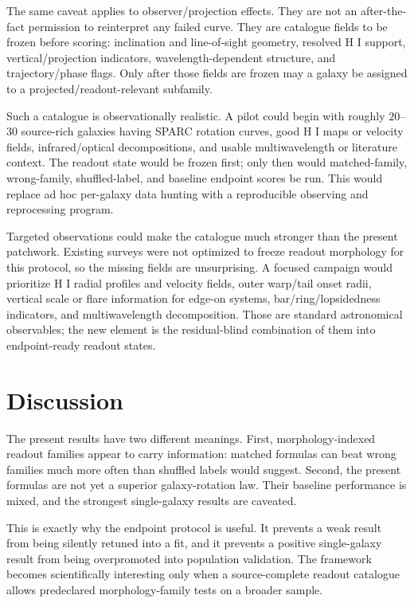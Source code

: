 \documentclass[11pt]{article}
\begin{document}
The same caveat applies to observer/projection effects.  They are not an
after-the-fact permission to reinterpret any failed curve.  They are catalogue
fields to be frozen before scoring: inclination and line-of-sight geometry,
resolved H I support, vertical/projection indicators, wavelength-dependent
structure, and trajectory/phase flags.  Only after those fields are frozen may a
galaxy be assigned to a projected/readout-relevant subfamily.

Such a catalogue is observationally realistic.  A pilot could begin with
roughly \(20\)--\(30\) source-rich galaxies having SPARC rotation curves, good H
I maps or velocity fields, infrared/optical decompositions, and usable
multiwavelength or literature context.  The readout state would be frozen first;
only then would matched-family, wrong-family, shuffled-label, and baseline
endpoint scores be run.  This would replace ad hoc per-galaxy data hunting with
a reproducible observing and reprocessing program.

Targeted observations could make the catalogue much stronger than the present
patchwork.  Existing surveys were not optimized to freeze readout morphology
for this protocol, so the missing fields are unsurprising.  A focused campaign
would prioritize H I radial profiles and velocity fields, outer warp/tail onset
radii, vertical scale or flare information for edge-on systems,
bar/ring/lopsidedness indicators, and multiwavelength decomposition.  Those are
standard astronomical observables; the new element is the residual-blind
combination of them into endpoint-ready readout states.

\section{Discussion}

The present results have two different meanings.  First, morphology-indexed
readout families appear to carry information: matched formulas can beat wrong
families much more often than shuffled labels would suggest.  Second, the
present formulas are not yet a superior galaxy-rotation law.  Their baseline
performance is mixed, and the strongest single-galaxy results are caveated.

This is exactly why the endpoint protocol is useful.  It prevents a weak result
from being silently retuned into a fit, and it prevents a positive
single-galaxy result from being overpromoted into population validation.  The
framework becomes scientifically interesting only when a source-complete
readout catalogue allows predeclared morphology-family tests on a broader
sample.
\end{document}
